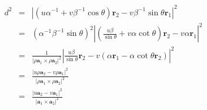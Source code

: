 \documentclass{beamer}
\newcommand{\tmmathbf}[1]{\ensuremath{\boldsymbol{#1}}}
\begin{document}
{{\begin{frame}
  \begin{eqnarray*}
    d^2 & = & | (u \alpha^{- 1} + v \beta^{- 1} \cos \theta) \tmmathbf{r}_2 -
    v \beta^{- 1} \sin \theta \tmmathbf{r}_1 |^2\\
    & = & (\alpha^{- 1} \beta^{- 1} \sin \theta)^2 \left| \left( \frac{u
    \beta}{\sin \theta} + v \alpha \cot \theta \right) \tmmathbf{r}_2 - v
    \alpha \tmmathbf{r}_1 \right|^2\\
    & = & \frac{1}{| \rho \tmmathbf{a}_1 \times \rho \tmmathbf{a}_2 |^2}
    \left| \frac{u \beta}{\sin \theta} \tmmathbf{r}_2 - v (\alpha
    \tmmathbf{r}_1 - \alpha \cot \theta \tmmathbf{r}_2) \right|^2\\
    & = & \frac{| u \rho \tmmathbf{a}_2 - v \rho \tmmathbf{a}_1 |^2}{| \rho
    \tmmathbf{a}_1 \times \rho \tmmathbf{a}_2 |^2}\\
    & = & \frac{| u\tmmathbf{a}_2 - v\tmmathbf{a}_1 |^2}{| \tmmathbf{a}_1
    \times \tmmathbf{a}_2 |^2}
  \end{eqnarray*}
  
\end{frame}}}
\end{document}
